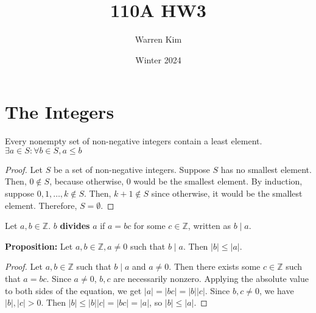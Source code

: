 \documentclass [12pt] {article}
\title{110A HW3}
\author{Warren Kim}
\date{Winter 2024}
\newcommand{\Z}{\mathbb{Z}}
\newenvironment{definition}[1]{\begin{tcolorbox}[title={Definition: #1},colback=blue!5!white,colframe=black!75!blue]}{\end{tcolorbox}}
\newenvironment{theorem}[1]{\begin{tcolorbox}[title={Theorem #1},colback=green!5!white,colframe=black!75!green]}{\end{tcolorbox}}
\renewcommand{\bf}[1]{\textbf{{#1}}}
\begin{document}
\section{The Integers}
\begin{theorem}{(Well-Ordering Principle)}
Every nonempty set of non-negative integers contain a least element. 
$\exists a \in S : \forall b \in S, a \leq b$
\end{theorem}
\begin{proof}
    Let $S$ be a set of non-negative integers. Suppose $S$ has no smallest element. Then, 
    $0 \not \in S$, because otherwise, $0$ would be the smallest element. By induction, suppose
    $0, 1, \ldots, k \not \in S$. Then, $k + 1 \not \in S$ since otherwise, it would be the smallest
    element. Therefore, $S = \emptyset$.
\end{proof}

\begin{definition}{Divides}
    Let $a, b \in \Z$. $b$ \bf{divides} $a$ if $a = bc$ for some $c \in \Z$, written as $b \mid a$.
\end{definition}
\bf{Proposition:} Let $a, b \in \Z, a \neq 0$ such that $b \mid a$. Then $|b| \leq |a|$.
\begin{proof}
    Let $a, b \in \Z$ such that $b \mid a$ and $a \neq 0$. Then there exists some $c \in \Z$ such that
    $a = bc$. Since $a \neq 0$, $b, c$ are necessarily nonzero. Applying the absolute value to both
    sides of the equation, we get $|a| = |bc| = |b||c|$. Since $b, c \neq 0$, we have $|b|, |c| > 0$.
    Then $|b| \leq |b||c| = |bc| = |a|$, so $|b| \leq |a|$.
\end{proof}
\end{document}
